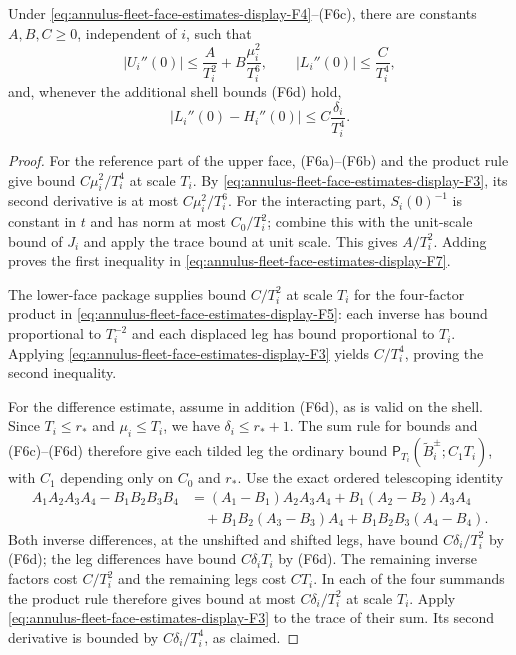 \begin{proposition}
\label{prop:ex-fleet-face-bounds}
Under \eqref{eq:annulus-fleet-face-estimates-display-F4}--(F6c), there are constants $A,B,C\geq0$, independent of
$i$, such that
\begin{equation}
 |U_i''(0)|\leq \frac{A}{T_i^2}
              +B\frac{\mu_i^2}{T_i^6},\qquad
 |L_i''(0)|\leq\frac{C}{T_i^4},
 \label{eq:annulus-fleet-face-estimates-display-F7}
\end{equation}
and, whenever the additional shell bounds (F6d) hold,
\begin{equation}
 |L_i''(0)-H_i''(0)|\leq C\frac{\delta_i}{T_i^4}.
 \label{eq:annulus-fleet-face-estimates-display-F8}
\end{equation}
\end{proposition}
\begin{proof}
For the reference part of the upper face, (F6a)--(F6b) and the product
rule give bound $C\mu_i^2/T_i^4$ at scale $T_i$. By \eqref{eq:annulus-fleet-face-estimates-display-F3}, its second
derivative is at most $C\mu_i^2/T_i^6$. For the interacting part,
$S_i(0)^{-1}$ is constant in $t$ and has norm at most $C_0/T_i^2$;
combine this with the unit-scale bound of $J_i$ and apply the trace
bound at unit scale. This gives $A/T_i^2$. Adding proves the first
inequality in \eqref{eq:annulus-fleet-face-estimates-display-F7}.

The lower-face package supplies bound $C/T_i^2$ at scale $T_i$ for the
four-factor product in \eqref{eq:annulus-fleet-face-estimates-display-F5}: each inverse has bound proportional to
$T_i^{-2}$ and each displaced leg has bound proportional to $T_i$.
Applying \eqref{eq:annulus-fleet-face-estimates-display-F3} yields $C/T_i^4$, proving the second inequality.

For the difference estimate, assume in addition (F6d), as is valid on the
shell. Since $T_i\leq r_*$ and $\mu_i\leq T_i$, we have
$\delta_i\leq r_*+1$. The sum rule for bounds and (F6c)--(F6d) therefore
give each tilded leg the ordinary bound
$\mathsf P_{T_i}(\widetilde B_i^\pm;C_1T_i)$, with $C_1$ depending only
on $C_0$ and $r_*$. Use the exact ordered telescoping identity
\begin{equation}
 \begin{aligned}
 A_1A_2A_3A_4-B_1B_2B_3B_4
 &= (A_1-B_1)A_2A_3A_4+B_1(A_2-B_2)A_3A_4\\
 &\quad+B_1B_2(A_3-B_3)A_4+B_1B_2B_3(A_4-B_4).
 \end{aligned}
 \label{eq:annulus-fleet-face-estimates-display-F9}
\end{equation}
Both inverse differences, at the unshifted and shifted legs, have bound
$C\delta_i/T_i^2$ by (F6d); the leg differences have bound
$C\delta_iT_i$ by (F6d). The remaining inverse factors cost $C/T_i^2$ and the remaining legs
cost $CT_i$. In each of the four summands the product rule therefore
gives bound at most $C\delta_i/T_i^2$ at scale $T_i$. Apply \eqref{eq:annulus-fleet-face-estimates-display-F3} to
the trace of their sum. Its second derivative is bounded by
$C\delta_i/T_i^4$, as claimed.
\end{proof}

